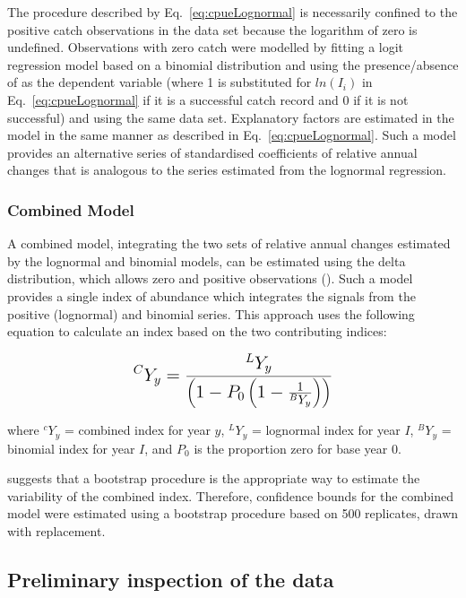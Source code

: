 The procedure described by Eq.~\ref{eq:cpueLognormal} is necessarily confined to the positive catch observations in the data set because the logarithm of zero is undefined. Observations with zero catch were modelled by fitting a logit regression model based on a binomial distribution and using the presence/absence of \fishname as the dependent variable (where 1 is substituted for $ln(I_i)$ in Eq.~\ref{eq:cpueLognormal} if it is a successful catch record and 0 if it is not successful) and using the same data set. Explanatory factors are estimated in the model in the same manner as described in Eq.~\ref{eq:cpueLognormal}. Such a model provides an alternative series of standardised coefficients of relative annual changes that is analogous to the series estimated from the lognormal regression.

\subsubsection{Combined Model}

A combined model, integrating the two sets of relative annual changes estimated by the lognormal and binomial models, can be estimated using the delta distribution, which allows zero and positive observations (\citet{vignaux1994}). Such a model provides a single index of abundance which integrates the signals from the positive (lognormal) and binomial series. This approach uses the following equation to calculate an index based on the two contributing indices:

\begin{align} \label{eq:cpueGeom}
\bM{^CY_y=\frac{^LY_y}{\left(1-P_0\left(1-\frac{1}{^BY_y}\right)\right)}}
\end{align}
\begin{addmargin}[3em]{1em}
where $^cY_y$ = combined index for year $y$, $^LY_y$ = lognormal index for year $I$, $^BY_y$ = binomial index for year $I$, and $P_0$ is the proportion zero for base year $0$. 
\end{addmargin}

\citet{francis2001} suggests that a bootstrap procedure is the appropriate way to estimate the variability of the combined index. Therefore, confidence bounds for the combined model were estimated using a bootstrap procedure based on 500 replicates, drawn with replacement.

\subsection{Preliminary inspection of the data}

